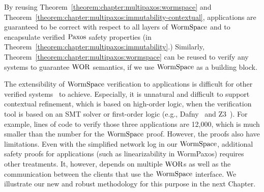 By reusing Theorem~\ref{theorem:chapter:multipaxos:wormspace} and Theorem~\ref{theorem:chapter:multipaxos:immutability-contextual},
applications are guaranteed to be correct with respect to all layers of $\mathrm{WormSpace}$ and
 to encapsulate verified $\mathrm{Paxos}$ safety properties (in Theorem~\ref{theorem:chapter:multipaxos:immutability}.)
 Similarly, Theorem~\ref{theorem:chapter:multipaxos:wormspace} can be reused to verify any systems to guarantee $\mathrm{WOR}$ semantics, 
if we use $\mathrm{WormSpace}$ as a building block. 
        
The extensibility of $\mathrm{WormSpace}$ verification to applications is difficult for other verified systems~\cite{ironfleet, hyperkernel} to achieve. 
Especially, it is unnatural and difficult to support contextual refinement, 
which is based on high-order logic, when the verification tool is based on an SMT solver or first-order logic (e.g., Dafny~\cite{dafny} 
and Z3~\cite{moura08}). 
For example, lines of code to verify those three applications are 12,000, which is much smaller than the number for the $\mathrm{WormSpace}$ proof. 
However, the proofs also have limitations. 
Even with the simplified network log in our $\mathrm{WormSpace}$, additional safety proofs for applications (such as linearizability in WormPaxos) 
requires other treatments. 
It, however, depends on multiple $\mathrm{WOR}$s as well as the communication between the clients that use the $\mathrm{WormSpace}$ interface. 
We illustrate our new and robust methodology for this purpose in the next Chapter.






